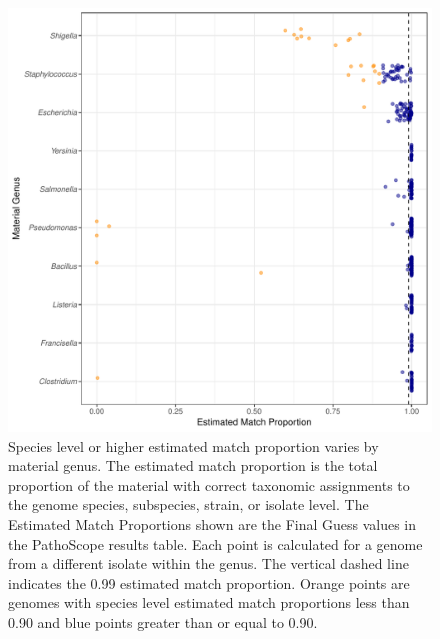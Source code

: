 \documentclass[fleqn,10pt,lineno]{wlpeerj}\usepackage[]{graphicx}\usepackage[]{color}
\makeatletter
\def\maxwidth{ %
  \ifdim\Gin@nat@width>\linewidth
    \linewidth
  \else
    \Gin@nat@width
  \fi
}
\newenvironment{knitrout}{}{} %
\providecommand{\DIFaddendFL}{} %
\makeatother
\begin{document}
\begin{knitrout}
\color{fgcolor}\begin{figure}
\DIFaddendFL \includegraphics[width=\maxwidth]{figure/species_prop-1} \caption[Species level or higher estimated match proportion varies by material genus]{Species level or higher estimated match proportion varies by material genus. The estimated match proportion is the total proportion of the material with correct taxonomic assignments to the genome species, subspecies, strain, or isolate level. The Estimated Match Proportions shown are the Final Guess values in the PathoScope results table. Each point is calculated for a genome from a different isolate within the genus. The vertical dashed line indicates the 0.99 estimated match proportion. Orange points are genomes with species level estimated match proportions less than 0.90 and blue points greater than or equal to 0.90.}\label{fig:species_prop}
\end{figure}


\end{knitrout}
\end{document}
